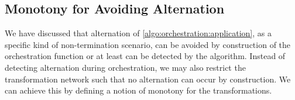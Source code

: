 

\subsection{Monotony for Avoiding Alternation}

We have discussed %
that alternation of \autoref{algo:orchestration:application}, as a specific kind of non-termination scenario, can be avoided by construction of the orchestration function or at least can be detected by the  algorithm.
Instead of detecting alternation during orchestration, we may also restrict the transformation network such that no alternation can occur by construction.
We can achieve this by defining a notion of monotony for the transformations.

